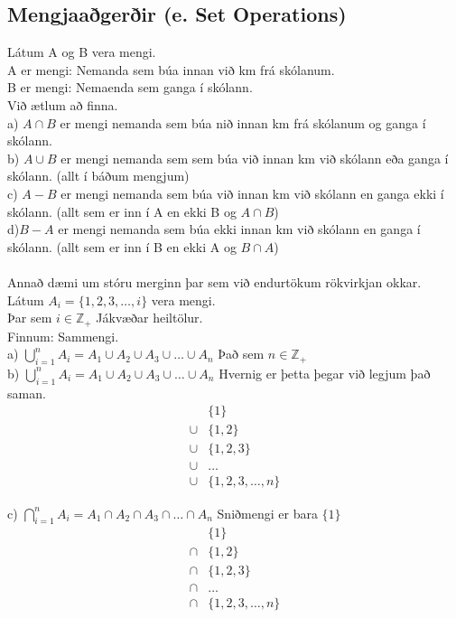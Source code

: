 \subsection{Mengjaaðgerðir (e. Set Operations)}
Látum A og B vera mengi.\\
A er mengi: Nemanda sem búa innan við km frá skólanum.\\
B er mengi: Nemaenda sem ganga í skólann.\\
Við ætlum að finna.\\
a) $A\cap B$ er mengi nemanda sem búa nið innan km frá skólanum og ganga í skólann.\\
b) $A \cup B$ er mengi nemanda sem sem búa við innan km við skólann eða ganga í skólann. (allt í báðum mengjum)\\
c) $A - B$ er mengi nemanda sem búa við innan km við skólann en ganga ekki í skólann. (allt sem er inn í A en ekki B og $A \cap B$)\\
d)$B-A$ er mengi nemanda sem búa ekki innan km við skólann en ganga í skólann. (allt sem er inn í B en ekki A og $B \cap A$)\\
\\
Annað dæmi um stóru merginn þar sem við endurtökum rökvirkjan okkar.\\
Látum $A_i = \{1,2,3,\ldots ,i\}$ vera mengi.\\
Þar sem $i \in \mathbb{Z}_+$ Jákvæðar heiltölur.\\
Finnum: Sammengi.\\

a) $\displaystyle \bigcup_{i=1}^n A_i = A_1 \cup A_2 \cup A_3 \cup \ldots \cup A_n$ Það sem $n \in \mathbb{Z}_+$\\

b) $\displaystyle \bigcup_{i=1}^n A_i = A_1 \cup A_2 \cup A_3 \cup \ldots \cup A_n$ Hvernig er þetta þegar við legjum það saman.\\
\begin{align*}
    & \{1\}\\
    \cup & \{1,2\}\\
    \cup & \{1,2,3\}\\
    \cup & \ldots\\
    \cup & \{1,2,3, \ldots ,n\}
\end{align*}

c) $\displaystyle \bigcap_{i=1}^n A_i = A_1 \cap A_2 \cap A_3 \cap \ldots \cap A_n$ Sniðmengi er bara $\{1\}$\\
\begin{align*}
    & \{1\}\\
    \cap & \{1,2\}\\
    \cap & \{1,2,3\}\\
    \cap & \ldots\\
    \cap & \{1,2,3, \ldots ,n\}
\end{align*}
\newpage

